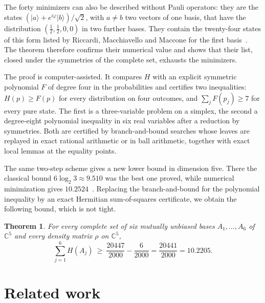 \documentclass[11pt,a4paper]{article}
\newtheorem{theorem}{Theorem}
\theoremstyle{plain}
\newenvironment{statementframe}{%
  \par\addvspace{0.55\baselineskip}\noindent
  \begingroup\setlength{\fboxrule}{0.3pt}\setlength{\fboxsep}{7pt}%
  \begin{lrbox}{\statementbox}%
  \begin{minipage}{\dimexpr\linewidth-2\fboxsep-2\fboxrule\relax}%
}{%
  \end{minipage}\end{lrbox}%
  {\color{black!45}\fbox{\color{black}\usebox{\statementbox}}}%
  \endgroup\par\addvspace{0.45\baselineskip}%
}
\newcommand{\C}{\mathbb C}
\newcommand{\ket}[1]{\lvert#1\rangle}
\begin{document}
The forty minimizers can also be described without Pauli operators: they are
the states $(\ket{a}+e^{i\varphi}\ket{b})/\sqrt2$, with $a\ne b$ two vectors of
one basis, that have the distribution $(\tfrac12,\tfrac12,0,0)$ in two further
bases. They contain the twenty-four states of this form listed by Riccardi,
Macchiavello and Maccone for the first basis~\cite[Eq.~(52)]{RMM2017}. The
theorem therefore confirms their numerical value and shows that their list,
closed under the symmetries of the complete set, exhausts the minimizers.

The proof is computer-assisted. It compares $H$ with an explicit symmetric
polynomial $F$ of degree four in the probabilities and certifies two
inequalities: $H(p)\ge F(p)$ for every distribution on four outcomes, and
$\sum_jF(p_j)\ge7$ for every pure state. The first is a three-variable problem
on a simplex, the second a degree-eight polynomial inequality in six real
variables after a reduction by symmetries. Both are certified by
branch-and-bound searches whose leaves are replayed in exact rational
arithmetic or in ball arithmetic, together with exact local lemmas at the
equality points.

The same two-step scheme gives a new lower bound in dimension five. There the
classical bound $6\log_2 3\approx 9.510$ was the best one proved, while
numerical minimization gives $10.2524$~\cite{RMM2017}. Replacing the
branch-and-bound for the polynomial inequality by an exact Hermitian
sum-of-squares certificate, we obtain the following bound, which is not
tight.

\begin{statementframe}
\begin{theorem}\label{thm:d5}
For every complete set of six mutually unbiased bases $A_1,\dots,A_6$ of $\C^5$
and every density matrix $\rho$ on $\C^5$,
\begin{equation}
  \sum_{j=1}^{6}H(A_j)\ \ge\ \frac{20447}{2000}-\frac{6}{2000}=\frac{20441}{2000}=10.2205 .
\end{equation}
\end{theorem}
\end{statementframe}

\section{Related work}
\end{document}
